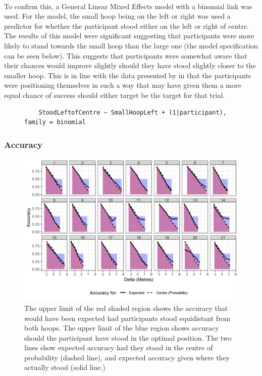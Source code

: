 \documentclass[12pt]{article}
\begin{document}
\paragraph{} To confirm this, a General Linear Mixed Effects model with a binomial link was used. For the model, the small hoop being on the left or right was used a predictor for whether the participant stood either on the left or right of centre. The results of this model were significant suggesting that participants were more likely to stand towards the small hoop than the large one (the model specification can be seen below). This suggests that participants were somewhat aware that their chances would improve slightly should they have stood slightly closer to the smaller hoop. This is in line with the data presented by \cite{CHAPMAN2010168} in that the participants were positioning themselves in such a way that may have given them a more equal chance of success should either target be the target for that trial.

\begin{figure}[!ht]
	\centering
	\begin{BVerbatim}
	StoodLeftofCentre ~ SmallHoopLeft + (1|participant), family = binomial
	\end{BVerbatim}
\end{figure}

\subsubsection*{Accuracy}
\begin{figure}[ht!]%
	\includegraphics[scale=0.9]{Figures/Experiment_3_Hoop_size/Accuracyshaded_regions}
	\centering
	\captionsetup{justification=centering}
	\caption{The upper limit of the red shaded region shows the accuracy that would have been expected had participants stood equidistant from both hoops. The upper limit of the blue region shows accuracy should the participant have stood in the optimal position. The two lines show expected accuracy had they stood in the centre of probability (dashed line), and expected accuracy given where they actually stood (solid line.)}
	\label{fig:Session2-Hoopsizes-Accuracy}
\end{figure}
\end{document}
